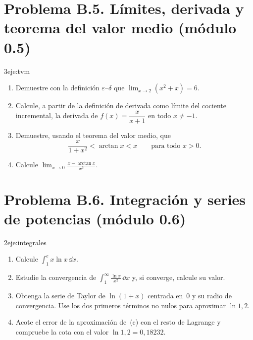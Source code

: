 \section*{Problema B.5. Límites, derivada y teorema del valor medio (módulo 0.5)}

\begin{ejercicio}{3}{eje:tvm}
\begin{enumerate}[label=(\alph*)]
  \item {} Demuestre con la definición $\varepsilon$--$\delta$ que $\displaystyle\lim_{x\to2}(x^{2}+x)=6$.
  \item {} Calcule, a partir de la definición de derivada como límite del cociente incremental, la derivada de $f(x)=\dfrac{x}{x+1}$ en todo $x\neq-1$.
  \item {} Demuestre, usando el teorema del valor medio, que
  \[
  \frac{x}{1+x^{2}}<\arctan x<x\qquad\text{para todo }x>0 .
  \]
  \item {} Calcule $\displaystyle\lim_{x\to0}\frac{x-\arctan x}{x^{3}}$.
\end{enumerate}
\end{ejercicio}

\section*{Problema B.6. Integración y series de potencias (módulo 0.6)}

\begin{ejercicio}{2}{eje:integrales}
\begin{enumerate}[label=(\alph*)]
  \item {} Calcule $\displaystyle\int_{1}^{e}x\ln x\,\dd x$.
  \item {} Estudie la convergencia de $\displaystyle\int_{1}^{\infty}\frac{\ln x}{x^{2}}\,\dd x$ y, si converge, calcule su valor.
  \item {} Obtenga la serie de Taylor de $\ln(1+x)$ centrada en~$0$ y su radio de convergencia. Use los dos primeros términos no nulos para aproximar $\ln 1{,}2$.
  \item {} Acote el error de la aproximación de~(c) con el resto de Lagrange y compruebe la cota con el valor $\ln1{,}2=0{,}18232$.
\end{enumerate}
\end{ejercicio}

